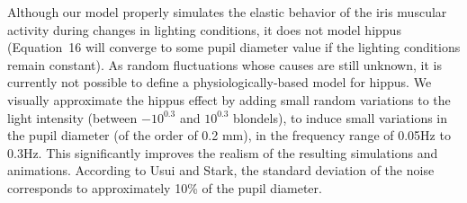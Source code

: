 \documentclass{acmtog}
\begin{document}
Although our model properly simulates the elastic behavior of the iris muscular activity during changes in lighting conditions, it does not model hippus (Equation~16 will converge to some pupil diameter value if the lighting conditions remain constant). As random fluctuations whose causes are still unknown, it is currently not possible to define a
 physiologically-based model for hippus. We visually approximate the hippus effect by adding small random variations to the light intensity (between $-10^{0.3}$ and $10^{0.3}$ blondels), to induce small variations in the pupil diameter (of the order of 0.2 mm), in the frequency range of 0.05Hz to 0.3Hz. This significantly improves the realism of the resulting simulations and animations. According to Usui and Stark, the standard deviation of the noise corresponds to approximately 10\% of the pupil diameter.
\end{document}
